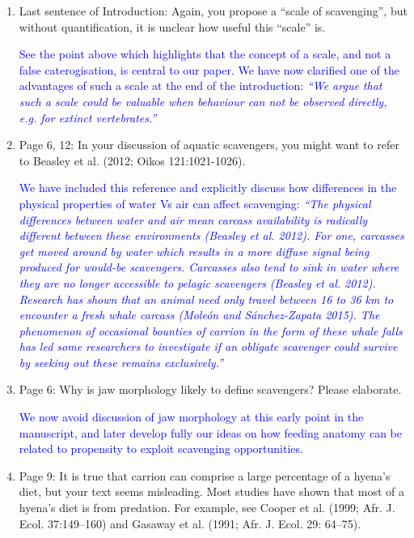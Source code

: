 \documentclass[12pt,letterpaper]{article}
\begin{document}
\begin{enumerate}
\item{Last sentence of Introduction: Again, you propose a ``scale of scavenging'', but without quantification, it is unclear how useful this ``scale'' is.}

\textcolor{blue}{See the point above which highlights that the concept of a scale, and not a false caterogisation, is central to our paper. We have now clarified one of the advantages of such a scale at the end of the introduction: \textit{``We argue that such a scale could be valuable when behaviour can not be observed directly, e.g. for extinct vertebrates.''}}

\item{Page 6, 12: In your discussion of aquatic scavengers, you might want to refer to Beasley et al. (2012; Oikos 121:1021-1026).}

\textcolor{blue}{We have included this reference and explicitly discuss how differences in the physical properties of water Vs air can affect scavenging: \textit{``The physical differences between water and air mean carcass availability is radically different between these environments (Beasley et al. 2012). For one, carcasses get moved around by water which results in a more diffuse signal being produced for would-be scavengers. Carcasses also tend to sink in water where they are no longer accessible to pelagic scavengers (Beasley et al. 2012). Research has shown that an animal need only travel between 16 to 36 km to encounter a fresh whale carcass  (Mole\'{o}n and Sánchez-Zapata 2015). The phenomenon of occasional bounties of carrion in the form of these whale falls has led some researchers to investigate if an obligate scavenger could survive by seeking out these remains exclusively.''}}

\item{Page 6: Why is jaw morphology likely to define scavengers?  Please elaborate.}

\textcolor{blue}{We now avoid discussion of jaw morphology at this early point in the manuscript, and later develop fully our ideas on how feeding anatomy can be related to propensity to exploit scavenging opportunities.}

\item{Page 9: It is true that carrion can comprise a large percentage of a hyena's diet, but your text seems misleading. Most studies have shown that most of a hyena's diet is from predation. For example, see Cooper et al. (1999; Afr. J. Ecol. 37:149–160) and Gasaway et al. (1991; Afr. J. Ecol. 29: 64–75).}


\end{enumerate}
\end{document}

